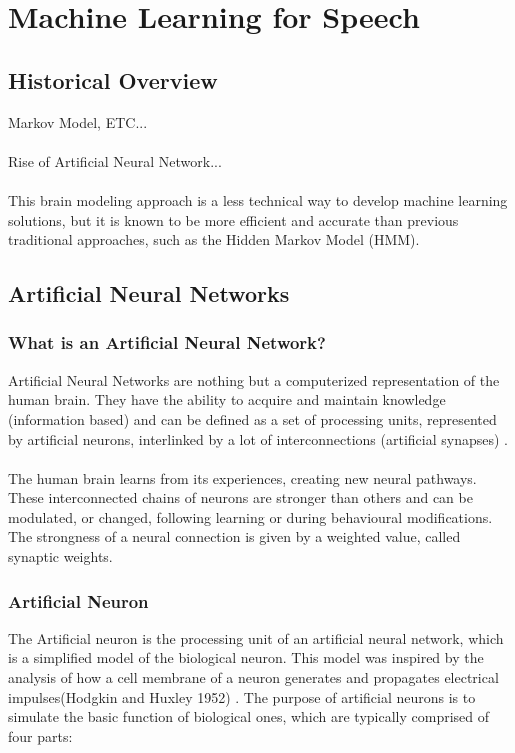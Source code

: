 \chapter{Machine Learning for Speech}\label{ch:machine_learning}

\section{Historical Overview}
Markov Model, ETC...\\\\
Rise of Artificial Neural Network...\\\\
This brain modeling approach is a less technical way to develop machine learning solutions, but it is known to be more efficient and accurate than previous traditional approaches,
such as the Hidden Markov Model (HMM). 

\section{Artificial Neural Networks}
\subsection{What is an Artificial Neural Network?}
Artificial Neural Networks are nothing but a computerized representation of the human brain. 
They have the ability to acquire and maintain knowledge (information based) and can be defined as a set of processing units, represented by artificial neurons,
interlinked by a lot of interconnections
(artificial synapses) \cite[p.~5]{Silva2016}.\\\\
The human brain learns from its experiences, creating new neural pathways. These interconnected chains of neurons are stronger than others and can be modulated, or changed,
following learning or during behavioural modifications.
The strongness of a neural connection is given by a weighted value, called synaptic weights.

\subsection{Artificial Neuron}
The Artificial neuron is the processing unit of an artificial neural network, which is a simplified model of the biological neuron.
This model was inspired by the analysis of how a cell membrane of a neuron generates and propagates electrical impulses(Hodgkin and Huxley 1952) \cite[p.~11]{Silva2016}.
The purpose of artificial neurons is to simulate the basic function of biological ones,
which are typically comprised of four parts:

